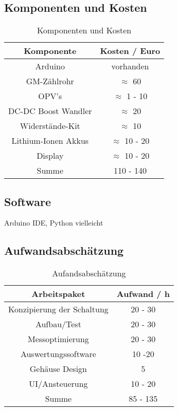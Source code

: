\subsection*{Komponenten und Kosten}
\begin{table}[H]
    \label{tab:eins}
    \centering
    \caption{Komponenten und Kosten}
    \begin{tabular}{cc} \hline
     Komponente& Kosten / Euro\\ \hline
     Arduino& vorhanden\\ \hline
     GM-Zählrohr& $\approx$ 60  \\ \hline
     OPV's& $\approx$ 1 - 10 \\ \hline
     DC-DC Boost Wandler& $\approx$ 20  \\ \hline
     Widerstände-Kit&$\approx$ 10 \\ \hline
     Lithium-Ionen Akkus & $\approx$ 10 - 20 \\ \hline
     Display & $\approx$ 10 - 20 \\ \hline \hline
     Summe & 110 - 140 \\ \hline
    \end{tabular}
    \end{table}
\subsection*{Software}
Arduino IDE, Python vielleicht

\subsection*{Aufwandsabschätzung}
\begin{table}[H]
    \label{tab:zwei}
    \centering
    \caption{Aufandsabschätzung}
    \begin{tabular}{cc} \hline
    Arbeitspaket & Aufwand / h \\ \hline
    Konzipierung der Schaltung &  20 - 30 \\ \hline
    Aufbau/Test & 20 - 30\\ \hline
    Messoptimierung & 20 - 30  \\ \hline
    Auswertungssoftware & 10 -20 \\ \hline
    Gehäuse Design & 5  \\ \hline
    UI/Ansteuerung  & 10 - 20  \\ \hline \hline
    Summe & 85 - 135  \\ \hline
    \end{tabular}
    \end{table}